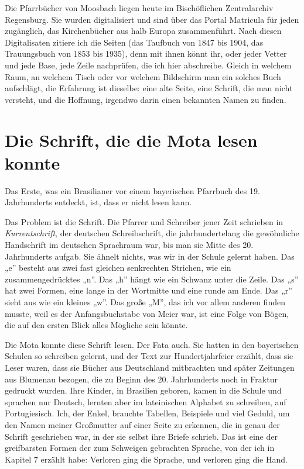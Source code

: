\documentclass[
  ngerman,
  11pt,
  openany]{book}
\begin{document}
Die Pfarrbücher von Moosbach liegen heute im Bischöflichen Zentralarchiv
Regensburg. Sie wurden digitalisiert und sind über das Portal Matricula
für jeden zugänglich, das Kirchenbücher aus halb Europa zusammenführt.
Nach diesen Digitalisaten zitiere ich die Seiten (das Taufbuch von 1847
bis 1904, das Trauungsbuch von 1853 bis 1935), denn mit ihnen könnt ihr,
oder jeder Vetter und jede Base, jede Zeile nachprüfen, die ich hier
abschreibe. Gleich in welchem Raum, an welchem Tisch oder vor welchem
Bildschirm man ein solches Buch aufschlägt, die Erfahrung ist dieselbe:
eine alte Seite, eine Schrift, die man nicht versteht, und die Hoffnung,
irgendwo darin einen bekannten Namen zu finden.

\section{Die Schrift, die die Mota lesen
konnte}\label{die-schrift-die-die-mota-lesen-konnte}

Das Erste, was ein Brasilianer vor einem bayerischen Pfarrbuch des 19.
Jahrhunderts entdeckt, ist, dass er nicht lesen kann.

Das Problem ist die Schrift. Die Pfarrer und Schreiber jener Zeit
schrieben in \emph{Kurrentschrift}, der deutschen Schreibschrift, die
jahrhundertelang die gewöhnliche Handschrift im deutschen Sprachraum
war, bis man sie Mitte des 20. Jahrhunderts aufgab. Sie ähnelt nichts,
was wir in der Schule gelernt haben. Das „e'' besteht aus zwei fast
gleichen senkrechten Strichen, wie ein zusammengedrücktes „n''. Das „h''
hängt wie ein Schwanz unter die Zeile. Das „s'' hat zwei Formen, eine
lange in der Wortmitte und eine runde am Ende. Das „r'' sieht aus wie
ein kleines „w''. Das große „M'', das ich vor allem anderen finden
musste, weil es der Anfangsbuchstabe von Meier war, ist eine Folge von
Bögen, die auf den ersten Blick alles Mögliche sein könnte.

Die Mota konnte diese Schrift lesen. Der Fata auch. Sie hatten in den
bayerischen Schulen so schreiben gelernt, und der Text zur
Hundertjahrfeier erzählt, dass sie Leser waren, dass sie Bücher aus
Deutschland mitbrachten und später Zeitungen aus Blumenau bezogen, die
zu Beginn des 20. Jahrhunderts noch in Fraktur gedruckt wurden. Ihre
Kinder, in Brasilien geboren, kamen in die Schule und sprachen nur
Deutsch, lernten aber im lateinischen Alphabet zu schreiben, auf
Portugiesisch. Ich, der Enkel, brauchte Tabellen, Beispiele und viel
Geduld, um den Namen meiner Großmutter auf einer Seite zu erkennen, die
in genau der Schrift geschrieben war, in der sie selbst ihre Briefe
schrieb. Das ist eine der greifbarsten Formen der zum Schweigen
gebrachten Sprache, von der ich in Kapitel 7 erzählt habe: Verloren ging
die Sprache, und verloren ging die Hand.
\end{document}
